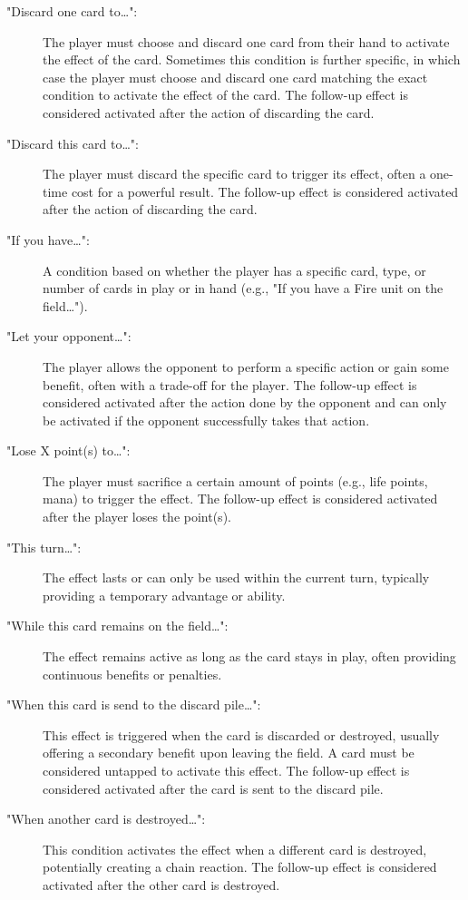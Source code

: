 \begin{description}
	\item["Discard one card to\dots":] The player must choose and discard one card from their hand to activate the effect of the card. Sometimes this condition is further specific, in which case the player must choose and discard one card matching the exact condition to activate the effect of the card. The  follow-up effect is considered activated after the action of discarding the card.
	\item["Discard this card to\dots":] The player must discard the specific card to trigger its effect, often a one-time cost for a powerful result. The  follow-up effect is considered activated after the action of discarding the card.
	\item["If you have\dots":] A condition based on whether the player has a specific card, type, or number of cards in play or in hand (e.g., "If you have a Fire unit on the field\dots").
	\item["Let your opponent\dots":] The player allows the opponent to perform a specific action or gain some benefit, often with a trade-off for the player. The follow-up effect is considered activated after the action done by the opponent and can only be activated if the opponent successfully takes that action.
	\item["Lose X point(s) to\dots":] The player must sacrifice a certain amount of points (e.g., life points, mana) to trigger the effect. The follow-up effect is considered activated after the player loses the point(s).
	\item["This turn\dots":] The effect lasts or can only be used within the current turn, typically providing a temporary advantage or ability.
	\item["While this card remains on the field\dots":] The effect remains active as long as the card stays in play, often providing continuous benefits or penalties.
	\item["When this card is send to the discard pile\dots":] This effect is triggered when the card is discarded or destroyed, usually offering a secondary benefit upon leaving the field. A card must be considered untapped to activate this effect. The follow-up effect is considered activated after the card is sent to the discard pile.
	\item["When another card is destroyed\dots":] This condition activates the effect when a different card is destroyed, potentially creating a chain reaction. The follow-up effect is considered activated after the other card is destroyed.

\end{description}
